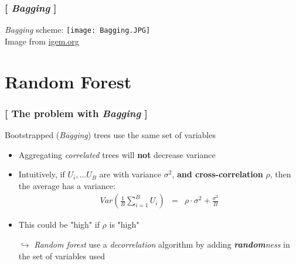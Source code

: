 \documentclass[xcolor=x11names,compress, handhouts]{beamer}
\renewcommand{\(}{\begin{columns}}
\renewcommand{\)}{\end{columns}}
\newcommand{\<}[1]{\begin{column}{#1}}
\renewcommand{\>}{\end{column}}
\begin{document}
\begin{frame}
\frametitle{\textcolor{brique}{[ \textit{Bagging} ]}}
\textit{Bagging} scheme:
\texttt{[image: Bagging.JPG]}\\
\vfill
\textcolor{gris}{\small Image from \href{http://2018.igem.org/Team:Jilin_China/Model/Screening_System}{igem.org}}

\end{frame}


\section{Random Forest}


\begin{frame}
\frametitle{\textcolor{brique}{[ The problem with \textit{Bagging} ]}}
 Bootstrapped (\textit{Bagging}) trees use the same set of variables
\pause
\begin{itemize}[<+->]
    \item Aggregating  \textit{correlated} trees  will \textbf{not}  decrease variance
    \item   Intuitively, if $U_{i}, \ldots U_{B}$ are with variance $\sigma^{2}$, \textbf{and cross-correlation} $\rho$,   then the average has a variance:
\begin{eqnarray*}
Var \left( \frac{1}{B} \sum_{i=1}^{B} U_i \right)  &=&   \rho \cdot \sigma^{2} + \frac{\sigma^{2}}{B}
\end{eqnarray*}
    \item This could be "high" if $\rho$ is "high"
    \item[$\hookrightarrow$] \textit{Random forest }use a \textit{decorrelation} algorithm by adding \textit{\textbf{random}ness} in the set of variables used
\end{itemize}
\end{frame}
\end{document}
